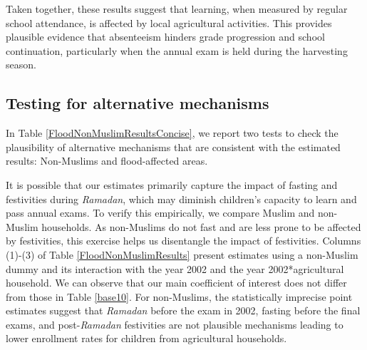 \documentclass[12pt,letterpaper]{article}
\newcommand{\0}{\ensuremath{\mbox{\boldmath $0$}}}
\begin{document}
Taken together, these results suggest that learning, when measured by regular school attendance, is affected by local agricultural activities. This provides plausible evidence that absenteeism hinders grade progression and school continuation, particularly when the annual exam is held during the harvesting season.


\subsection{Testing for alternative mechanisms}

In Table \ref{FloodNonMuslimResultsConcise}, we report two tests to check the plausibility of alternative mechanisms that are consistent with the estimated results: Non-Muslims and flood-affected areas. 

It is possible that our estimates primarily capture the impact of fasting and festivities during \textit{Ramadan}, which may diminish children's capacity to learn and pass annual exams. To verify this empirically, we compare Muslim and non-Muslim households. As non-Muslims do not fast and are less prone to be affected by festivities, this exercise helps us disentangle the impact of festivities. Columns (1)-(3) of Table \ref{FloodNonMuslimResults} present estimates using a non-Muslim dummy and its interaction with the year 2002 and the year 2002*agricultural household. We can observe that our main coefficient of interest does not differ from those in Table \ref{base10}. For non-Muslims, the statistically imprecise point estimates suggest that \textit{Ramadan} before the exam in 2002, fasting before the final exams, and post-\textit{Ramadan} festivities are not plausible mechanisms leading to lower enrollment rates for children from agricultural households.
\end{document}
